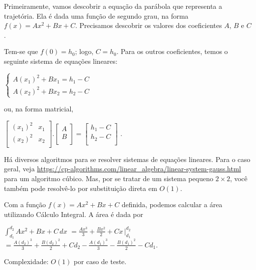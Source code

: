 Primeiramente, vamos descobrir a equação da parábola que representa a
trajetória. Ela é dada uma função de segundo grau, na forma $f(x) = Ax^2 + Bx + C$.
Precisamos descobrir os valores dos coeficientes $A$, $B$ e $C$.

Tem-se que $f(0) = h_0$; logo, $C=h_0$. Para os
outros coeficientes, temos o seguinte sistema de equações lineares:

$\begin{cases}
A(x_1)^2 + Bx_1 = h_1 - C\\
A(x_2)^2 + Bx_2 = h_2 - C
\end{cases}$

ou, na forma matricial,

$\begin{bmatrix}
(x_1)^2 & x_1 \\
(x_2)^2 & x_2 \\
\end{bmatrix}
.
\begin{bmatrix}
A \\
B \\
\end{bmatrix} =
\begin{bmatrix}
h_1 - C\\
h_2 - C\\
\end{bmatrix}
$
.

Há diversos algoritmos para se resolver sistemas de equações lineares. Para o
caso geral, veja \url{https://cp-algorithms.com/linear\_algebra/linear-system-gauss.html}
para um algoritmo cúbico.
Mas, por se tratar de um sistema pequeno $2 \times 2$, você também pode resolvê-lo por
substituição direta em $O(1)$.

Com a função $f(x) = Ax^2 + Bx + C$ definida, podemos calcular a área utilizando
Cálculo Integral. A área é dada por

$\displaystyle\int_{d_1}^{d_2} Ax^2 + Bx + C\,dx$
$\displaystyle = \frac{Ax^3}{3} + \frac{Bx^2}{2} + Cx\, \Big|_{d_1}^{d_2}$
$\displaystyle = \frac{A(d_2)^3}{3} + \frac{B(d_2)^2}{2} + Cd_2
- \frac{A(d_1)^3}{3} - \frac{B(d_1)^2}{2} - Cd_1$.

Complexidade: $O(1)$ por caso de teste.

